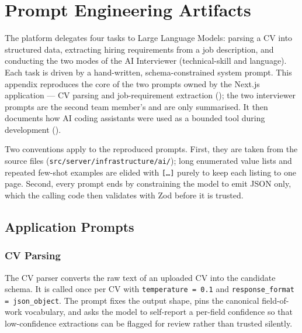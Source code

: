 \chapter{Prompt Engineering Artifacts}
\label{app:prompts}

The platform delegates four tasks to Large Language Models: parsing a CV into
structured data, extracting hiring requirements from a job description, and
conducting the two modes of the AI Interviewer (technical-skill and language).
Each task is driven by a hand-written, schema-constrained system prompt. This
appendix reproduces the core of the two prompts owned by the Next.js
application --- CV parsing and job-requirement extraction
(); the two interviewer prompts are the second
team member's and are only summarised. It then documents how AI coding
assistants were used as a bounded tool during development
().

Two conventions apply to the reproduced prompts. First, they are taken from the
source files (\texttt{src/server/infrastructure/ai/}); long enumerated value
lists and repeated few-shot examples are elided with \texttt{[\ldots]} purely to
keep each listing to one page. Second, every prompt ends by constraining the
model to emit JSON only, which the calling code then validates with Zod before
it is trusted.


\section{Application Prompts}
\label{app:prompts-application}

\subsection{CV Parsing}
\label{app:prompts-cv}

The CV parser converts the raw text of an uploaded CV into the candidate
schema. It is called once per CV with \texttt{temperature = 0.1} and
\texttt{response\_format = json\_object}. The prompt fixes the output shape,
pins the canonical field-of-work vocabulary, and asks the model to self-report
a per-field confidence so that low-confidence extractions can be flagged for
review rather than trusted silently.

